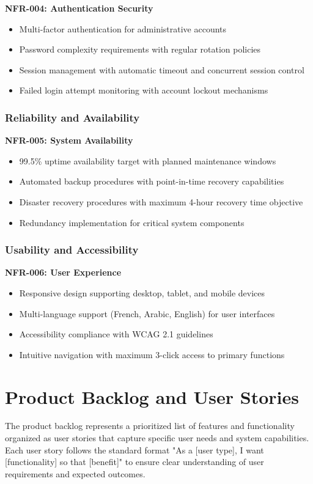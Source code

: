 \textbf{NFR-004: Authentication Security}
\begin{itemize}
\item Multi-factor authentication for administrative accounts
\item Password complexity requirements with regular rotation policies
\item Session management with automatic timeout and concurrent session control
\item Failed login attempt monitoring with account lockout mechanisms
\end{itemize}

\subsubsection{Reliability and Availability}
\textbf{NFR-005: System Availability}
\begin{itemize}
\item 99.5\% uptime availability target with planned maintenance windows
\item Automated backup procedures with point-in-time recovery capabilities
\item Disaster recovery procedures with maximum 4-hour recovery time objective
\item Redundancy implementation for critical system components
\end{itemize}

\subsubsection{Usability and Accessibility}
\textbf{NFR-006: User Experience}
\begin{itemize}
\item Responsive design supporting desktop, tablet, and mobile devices
\item Multi-language support (French, Arabic, English) for user interfaces
\item Accessibility compliance with WCAG 2.1 guidelines
\item Intuitive navigation with maximum 3-click access to primary functions
\end{itemize}

\section{Product Backlog and User Stories}

The product backlog represents a prioritized list of features and functionality organized as user stories that capture specific user needs and system capabilities. Each user story follows the standard format "As a [user type], I want [functionality] so that [benefit]" to ensure clear understanding of user requirements and expected outcomes.

